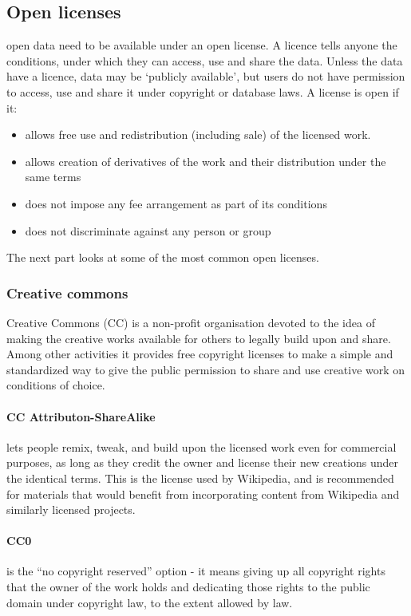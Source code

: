 \documentclass[thesis=B,english]{FITthesis}[2012/06/26]
\begin{document}
	\subsection{Open licenses}
	\label{licenses}
	open data need to be available under an open license. A licence tells anyone the conditions, under which they can access, use and share the data. Unless the data have a licence, data may be ‘publicly available’, but users do not have permission to access, use and share it under copyright or database laws. A license is open if it:
	\begin{itemize}
		\item allows free use and redistribution (including sale) of the licensed work.
		\item allows creation of derivatives of the work and their distribution under the same terms
		\item does not impose any fee arrangement as part of its conditions
		\item does not discriminate against any person or group
	\end{itemize} 
	The next part looks at some of the most common open licenses. 
	\subsubsection{Creative commons}
	Creative Commons (CC) is a non-profit organisation devoted to the idea of making the creative works available for others to legally build upon and share. Among other activities it provides free copyright licenses to make a simple and standardized way to give the public permission to share and use creative work on conditions of choice. \cite{creativecommons}
	\paragraph{CC Attributon-ShareAlike}
	lets people remix, tweak, and build upon the licensed work even for commercial purposes, as long as they credit the owner and license their new creations under the identical terms. This is the license used by Wikipedia, and is recommended for materials that would benefit from incorporating content from Wikipedia and similarly licensed projects.
	\paragraph{CC0}
	is the ``no copyright reserved'' option - it means giving up all copyright rights that the owner of the work holds and dedicating those rights to the public domain under copyright law, to the extent allowed by law.
\end{document}
